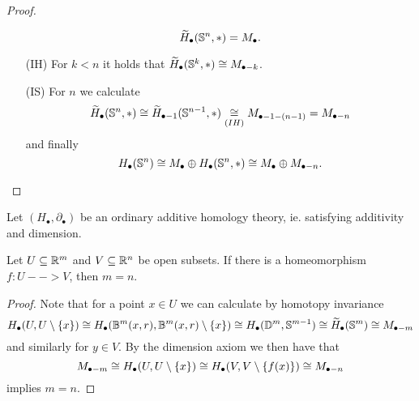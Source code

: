 \begin{proof}
\begin{enumerate}
{\begin{equation*}
					\widetilde{H}_\bullet(\S^n,*) = M_\bullet.
				\end{equation*}
			}
			\item[(IH)]{
				For $k<n$ it holds that $\widetilde{H}_\bullet(\S^k,*) \isom M_{\bullet-k}$.
			}
			\item[(IS)]{
				For $n$ we calculate
				\begin{equation*}
					\widetilde{H}_\bullet(\S^n,*) \isom \widetilde{H}_{\bullet-1}(\S^{n-1},*) \underset{(IH)}{\isom} M_{\bullet-1-(n-1)} = M_{\bullet-n}
				\end{equation*}
				and finally
				\begin{equation*}
					H_\bullet(\S^n) \isom M_\bullet \oplus H_\bullet(\S^n,*) \isom M_\bullet \oplus M_{\bullet-n}.
				\end{equation*}
			}\vspace{-3.5em}
		\end{enumerate}
	\end{proof}

	\begin{theorem}
		Let $(H_\bullet, \partial_\bullet)$ be an ordinary additive homology theory, ie. satisfying additivity and dimension.

		Let $U \subseteq \R^m$ and $V \subseteq \R^n$ be open subsets. If there is a homeomorphism $f:U-->V$, then $m = n$.
	\end{theorem}
	\begin{proof}
		Note that for a point $x \in U$ we can calculate by homotopy invariance
		\begin{equation*}
			H_\bullet(U,U\setminus\{x\}) \isom H_\bullet(\B^m(x,r),\B^m(x,r)\setminus\{x\}) \isom H_\bullet(\D^m,\S^{m-1}) \isom \widetilde{H}_\bullet(\S^m) \isom M_{\bullet-m}
		\end{equation*}
		and similarly for $y \in V$. By the dimension axiom we then have that 
		\begin{equation*}
			M_{\bullet-m} \isom H_\bullet(U,U\setminus\{x\}) \isom H_\bullet(V,V\setminus\{f(x)\}) \isom M_{\bullet-n}
		\end{equation*}
		implies $m=n$.
	\end{proof}

